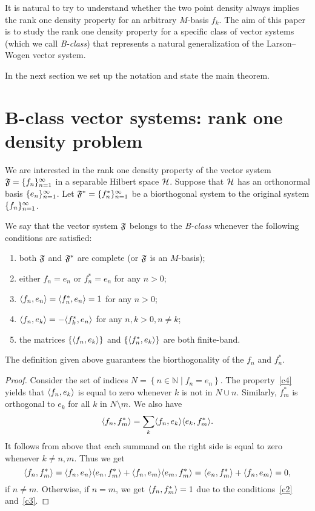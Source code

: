 \documentclass[12pt,oneside,a4paper]{amsart}
\begin{document}
  It is natural to try to understand whether the two point density always implies the rank one density property for an arbitrary $M$-basis $f_k$.
  The aim of this paper is to study the rank one density property for a specific class of vector systems (which we call \emph{B-class})
    that represents a natural generalization of the Larson--Wogen vector system.

  In the next section we set up the notation and state the main theorem.

\bigskip
\section{B-class vector systems: rank one density problem}
    \label{fsys2graphs}
    We are interested in the rank one density property of the vector system $\fsys = \seq{f}$
      in a separable Hilbert space $\cal{H}$.
    Suppose that $\cal{H}$ has an orthonormal basis $\seq{e}$.
    Let $\fstarsys = \{f_n^{*}\}_{n=1}^\infty$ be a biorthogonal system to the original system $\seq{f}$.
    \begin{definition}
      We say that the vector system $\fsys$ belongs to the \emph{B-class} whenever the following conditions are satisfied:
      \begin{enumerate}[label=\textbf{C\arabic*}]
        \item \label{c1} both $\fsys$ and $\fstarsys$ are complete (or $\fsys$ is an $M$-basis);
        \item \label{c2} either $f_n = e_n$ or $f^*_n = e_n$ for any $n > 0$;
        \item \label{c3} $\inner{f_n}{e_n} = \inner{f^*_n}{e_n} = 1$ for any $n > 0$;
        \item \label{c4} $\inner{f_n}{e_k} = -\inner{f^*_k}{e_n}$ for any $n, k > 0, n \neq k$;
        \item \label{c5} the matrices $\{\inner{f_n}{e_k}\}$ and $\{\inner{f^*_n}{e_k}\}$ are both finite-band.
      \end{enumerate}
    \end{definition}
    \begin{prop}
      The definition given above guarantees the biorthogonality of the $f_n$ and $f^*_n$.
    \end{prop}
    \begin{proof}
      Consider the set of indices $N = \left\{n \in \mathbb{N} \mid f_n = e_n \right\}$.
      The property~\ref{c4} yields that $\inner{f_n}{e_k}$ is equal to zero whenever $k$ is not in
        $N \cup {n}$.
      Similarly, $f^*_m$ is orthogonal to $e_k$ for all $k$ in $N \setminus {m}$.
      We also have
      \[
        \inner{f_n}{f^*_m} = \sum_{k} \inner{f_n}{e_k} \inner{e_k}{f^*_m}.
      \]
      It follows from above that each summand on the right side is equal to zero whenever $k \neq n, m$.
      Thus we get
      \[
        \inner{f_n}{f^*_m} = \inner{f_n}{e_n} \inner{e_n}{f^*_m} + \inner{f_n}{e_m} \inner{e_m}{f^*_m}
        = \inner{e_n}{f^*_m} + \inner{f_n}{e_m} = 0,
      \]
      if $n \neq m$.
      Otherwise, if $n = m$, we get $\inner{f_n}{f^*_m} = 1$ due to the conditions~\ref{c2} and~\ref{c3}.
    \end{proof}
\end{document}

